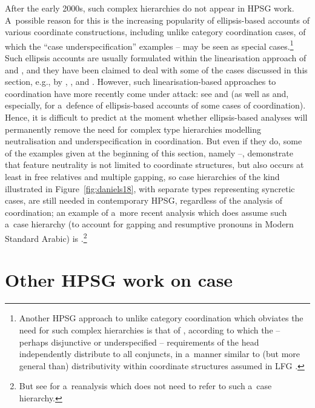 \documentclass[output=paper
	        ,collection
	        ,collectionchapter
 	        ,biblatex
                ,babelshorthands
                ,newtxmath
                ,draftmode
                ,colorlinks, citecolor=brown
]{./langsci/langscibook}
\begin{document}
\begin{exe}
\begin{xlist}
\begin{exe}
\begin{xlist}
After the early 2000s, such complex  hierarchies do not appear in HPSG work.  A~possible
reason for this is the increasing popularity of ellipsis-based accounts of various coordinate
constructions, including unlike category coordination cases, of which the “case underspecification”
examples – may be seen as special cases.\footnote{Another HPSG
  approach to unlike category coordination which obviates the need for such complex hierarchies is
  that of \citet{yata:04}, according to which the – perhaps disjunctive or underspecified –
  requirements of the head independently distribute to all conjuncts, in a~manner similar to (but
  more general than) distributivity within coordinate structures assumed in LFG
  \citep{DK2000a,dal:kin:sad:09,prz:pat:12a}.}  Such ellipsis accounts are usually formulated within
the linearisation approach of \citet{Reape92a,Reape94a} and \citet{Kathol95a}, and they have
been claimed to deal with some of the cases discussed in this section, e.g., by
\citet{Crysmann2003c}, \citet{BS2004a}, and \citet{chav:06,chav:08}.  However, such
linearisation-based approaches to coordination have more recently come under attack: see
\citet{levi:11} and \citet{kub:lev:15} (as well as \citealt{yata:12,Yatabe2016a-u} and, especially,
\citealt{yat:wai:18} for a~defence of ellipsis-based accounts of some cases of coordination).
Hence, it is difficult to predict at the moment whether ellipsis-based analyses will permanently
remove the need for complex type hierarchies modelling neutralisation and underspecification in
coordination.  But even if they do, some of the examples given at the beginning of this section,
namely –, demonstrate that feature neutrality is not limited to
coordinate structures, but also occurs at least in free relatives and multiple gapping, so case
hierarchies of the kind illustrated in Figure~\ref{fig:daniels18}, with separate types representing syncretic cases, are still needed in contemporary HPSG, regardless of the analysis of coordination; an example of a~more recent analysis which does assume such a~case hierarchy (to account for gapping and resumptive pronouns in Modern Standard Arabic) is \citet{AB2013a-u}.\footnote{But see \citet{crys:17} for a~reanalysis which does not need to refer to such a~case hierarchy.}



\section{Other HPSG work on case}
\label{sec:case:other}


\end{xlist}
\end{exe}
\end{xlist}
\end{exe}
\end{document}
